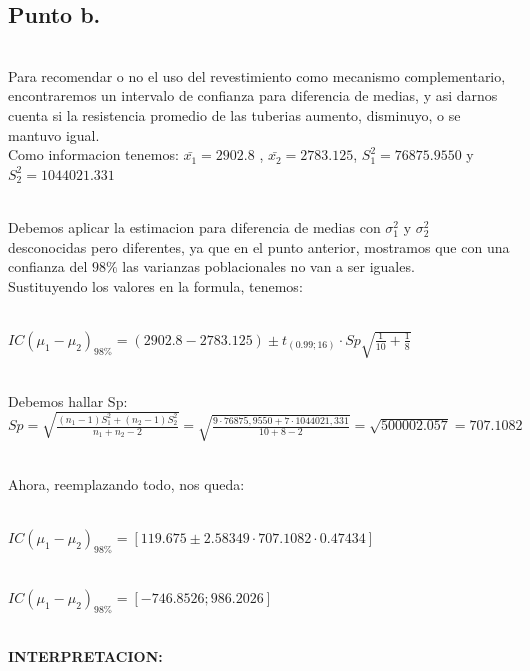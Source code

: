 \documentclass[letterpaper,12pt,onecolumn,titlepage]{article}
\begin{document}
\subsection{Punto b.}
~\\ Para recomendar o no el uso del revestimiento como mecanismo complementario, encontraremos un intervalo de confianza para diferencia de medias, y asi darnos cuenta si la resistencia promedio de las tuberias aumento, disminuyo, o se mantuvo igual.
~\\ Como informacion tenemos: $\bar{x_1}=2902.8$ , $\bar{x_2}=2783.125$, $S_{1}^2=76875.9550$ y $S_{2}^2=1044021.331$

~\\ Debemos aplicar la estimacion para diferencia de medias con $\sigma_{1}^2$ y $\sigma_{2}^2$ desconocidas pero diferentes, ya que en el punto anterior, mostramos que con una confianza del $98\%$ las varianzas poblacionales no van a ser iguales.
~\\ Sustituyendo los valores en la formula, tenemos:

~\\ $IC(\mu_1 - \mu_2)_{98\%}=(2902.8-2783.125)\pm t_{(0.99;16)}\cdot Sp\sqrt{\frac{1}{10}+\frac{1}{8}}$ 

~\\ Debemos hallar Sp:
~\\ $Sp=\sqrt{\frac{(n_{1}-1)S_{1}^2+(n_{2}-1)S_{2}^2}{n_{1}+n_{2}-2}}=\sqrt{\frac{9\cdot76875,9550+7\cdot1044021,331}{10+8-2}}=\sqrt{500002.057}=707.1082$

~\\ Ahora, reemplazando todo, nos queda:

~\\ $IC(\mu_1 - \mu_2)_{98\%}=[119.675 \pm 2.58349 \cdot 707.1082 \cdot 0.47434]$

~\\ $IC(\mu_1 - \mu_2)_{98\%}=[-746.8526 ; 986.2026]$

\pagebreak
~\\ \textbf{INTERPRETACION:}
\end{document}
